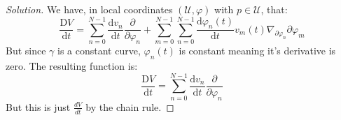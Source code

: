 \documentclass{article}
\theoremstyle{normal}
\begin{document}
    \begin{proof}[Solution]
        We have, in local coordinates $(\mathcal{U},\varphi)$ with
        $p\in\mathcal{U}$, that:
        \begin{equation}
            \frac{\textrm{D}V}{\textrm{d}t}=
                \sum_{n=0}^{N-1}\frac{\textrm{d}v_{n}}{\textrm{d}t}
                    \frac{\partial}{\partial\varphi_{n}}+
                \sum_{m=0}^{N-1}\sum_{n=0}^{N-1}
                    \frac{\textrm{d}\varphi_{n}(t)}{\textrm{d}t}v_{m}(t)
                    \nabla_{\partial\varphi_{n}}\partial\varphi_{m}
        \end{equation}
        But since $\gamma$ is a constant curve, $\varphi_{n}(t)$ is constant
        meaning it's derivative is zero. The resulting function is:
        \begin{equation}
            \frac{\textrm{D}V}{\textrm{d}t}=
                \sum_{n=0}^{N-1}\frac{\textrm{d}v_{n}}{\textrm{d}t}
                    \frac{\partial}{\partial\varphi_{n}}
        \end{equation}
        But this is just $\frac{dV}{dt}$ by the chain rule.
    \end{proof}
\end{document}
